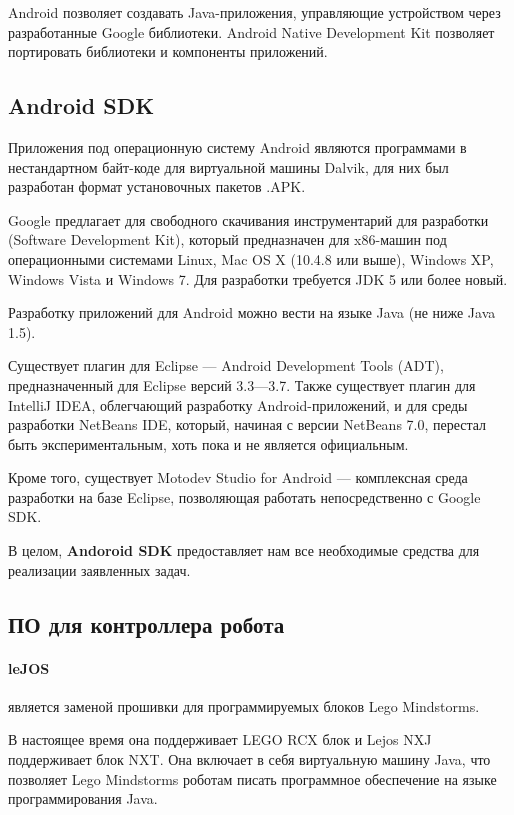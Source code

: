 Android позволяет создавать Java-приложения, управляющие устройством через разработанные Google библиотеки. Android Native Development Kit позволяет портировать библиотеки и компоненты приложений.

\subsection{Android SDK}

Приложения под операционную систему Android являются программами в нестандартном байт-коде для виртуальной машины Dalvik, для них был разработан формат установочных пакетов .APK.

Google предлагает для свободного скачивания инструментарий для разработки (Software Development Kit), который предназначен для x86-машин под операционными системами Linux, Mac OS X (10.4.8 или выше), Windows XP, Windows Vista и Windows 7. Для разработки требуется JDK 5 или более новый.

Разработку приложений для Android можно вести на языке Java (не ниже Java 1.5).

Существует плагин для Eclipse — Android Development Tools (ADT), предназначенный для Eclipse версий 3.3—3.7. Также существует плагин для IntelliJ IDEA, облегчающий разработку Android-приложений, и для среды разработки NetBeans IDE, который, начиная с версии NetBeans 7.0, перестал быть экспериментальным, хоть пока и не является официальным.

Кроме того, существует Motodev Studio for Android — комплексная среда разработки на базе Eclipse, позволяющая работать непосредственно с Google SDK.

В целом, \textbf{Andoroid SDK} предоставляет нам все необходимые средства для реализации заявленных задач.

\subsection{ПО для контроллера робота}

\paragraph{leJOS} является заменой прошивки для программируемых блоков Lego Mindstorms.

В настоящее время она поддерживает LEGO RCX блок и Lejos NXJ поддерживает блок NXT. Она включает в себя виртуальную машину Java, что позволяет Lego Mindstorms роботам писать программное обеспечение на языке программирования Java. 

